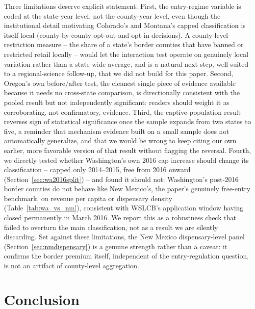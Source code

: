 \documentclass[12pt]{article}
\begin{document}
Three limitations deserve explicit statement. First, the entry-regime variable is coded at the state-year
level, not the county-year level, even though the institutional detail motivating Colorado's and Montana's
capped classification is itself local (county-by-county opt-out and opt-in decisions). A county-level
restriction measure -- the share of a state's border counties that have banned or restricted retail locally --
would let the interaction test operate on genuinely local variation rather than a state-wide average, and is a
natural next step, well suited to a regional-science follow-up, that we did not build for this paper. Second,
Oregon's own before/after test, the cleanest single piece of evidence available because it needs no cross-state
comparison, is directionally consistent with the pooled result but not independently significant; readers
should weight it as corroborating, not confirmatory, evidence. Third, the captive-population result reverses
sign of statistical significance once the sample expands from two states to five, a reminder that mechanism
evidence built on a small sample does not automatically generalize, and that we would be wrong to keep citing
our own earlier, more favorable version of that result without flagging the reversal. Fourth, we directly
tested whether Washington's own 2016 cap increase should change its classification -- capped only 2014--2015,
free from 2016 onward (Section~\ref{sec:wa2016split}) -- and found it should not: Washington's post-2016
border counties do not behave like New Mexico's, the paper's genuinely free-entry benchmark, on revenue per
capita or dispensary density (Table~\ref{tab:wa_vs_nm}), consistent with WSLCB's application window having
closed permanently in March 2016. We report this as a robustness check that failed to overturn the main
classification, not as a result we are silently discarding. Set against these limitations, the New Mexico
dispensary-level panel (Section~\ref{sec:nmdispensary}) is a genuine strength rather than a caveat: it confirms
the border premium
itself, independent of the entry-regulation question, is not an artifact of county-level aggregation.

\section{Conclusion}
\label{sec:conclusion}
\end{document}
